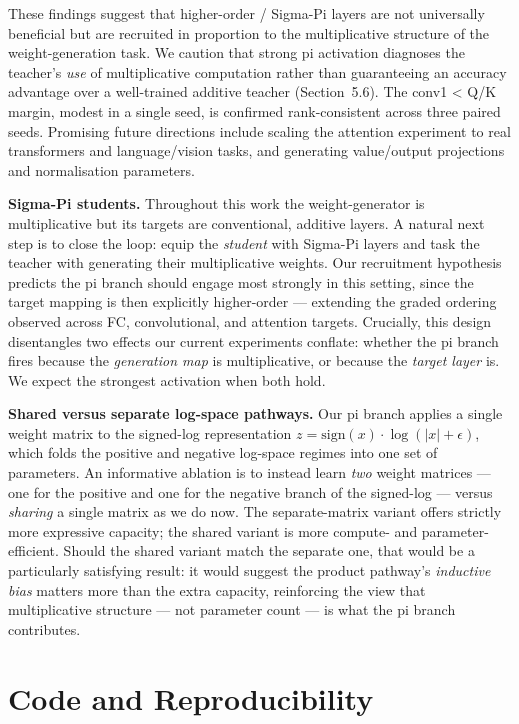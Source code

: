 \documentclass{article}
\begin{document}
These findings suggest that higher-order / Sigma-Pi layers are not universally beneficial but are recruited in proportion to the multiplicative structure of the weight-generation task. We caution that strong pi activation diagnoses the teacher's \emph{use} of multiplicative computation rather than guaranteeing an accuracy advantage over a well-trained additive teacher (Section~5.6). The conv1 \textless{} Q/K margin, modest in a single seed, is confirmed rank-consistent across three paired seeds. Promising future directions include scaling the attention experiment to real transformers and language/vision tasks, and generating value/output projections and normalisation parameters.

\textbf{Sigma-Pi students.} Throughout this work the weight-generator is multiplicative but its targets are conventional, additive layers. A natural next step is to close the loop: equip the \emph{student} with Sigma-Pi layers and task the teacher with generating their multiplicative weights. Our recruitment hypothesis predicts the pi branch should engage most strongly in this setting, since the target mapping is then explicitly higher-order --- extending the graded ordering observed across FC, convolutional, and attention targets. Crucially, this design disentangles two effects our current experiments conflate: whether the pi branch fires because the \emph{generation map} is multiplicative, or because the \emph{target layer} is. We expect the strongest activation when both hold.

\textbf{Shared versus separate log-space pathways.} Our pi branch applies a single weight matrix to the signed-log representation $z=\mathrm{sign}(x)\cdot\log(|x|+\epsilon)$, which folds the positive and negative log-space regimes into one set of parameters. An informative ablation is to instead learn \emph{two} weight matrices --- one for the positive and one for the negative branch of the signed-log --- versus \emph{sharing} a single matrix as we do now. The separate-matrix variant offers strictly more expressive capacity; the shared variant is more compute- and parameter-efficient. Should the shared variant match the separate one, that would be a particularly satisfying result: it would suggest the product pathway's \emph{inductive bias} matters more than the extra capacity, reinforcing the view that multiplicative structure --- not parameter count --- is what the pi branch contributes.

\section{Code and Reproducibility}\label{code-and-reproducibility}
\end{document}
